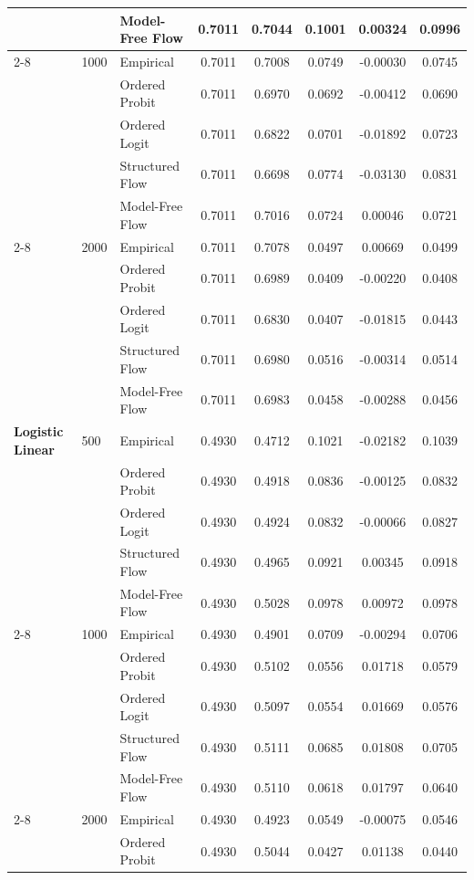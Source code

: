 \begin{table}[p]
\begin{tabular}{lllccccc}
 &  & Model-Free Flow & 0.7011 & 0.7044 & 0.1001 & 0.00324 & 0.0996 \\
\cline{2-8}
 & 1000 & Empirical & 0.7011 & 0.7008 & 0.0749 & -0.00030 & 0.0745 \\
 &  & Ordered Probit & 0.7011 & 0.6970 & 0.0692 & -0.00412 & 0.0690 \\
 &  & Ordered Logit & 0.7011 & 0.6822 & 0.0701 & -0.01892 & 0.0723 \\
 &  & Structured Flow & 0.7011 & 0.6698 & 0.0774 & -0.03130 & 0.0831 \\
 &  & Model-Free Flow & 0.7011 & 0.7016 & 0.0724 & 0.00046 & 0.0721 \\
\cline{2-8}
 & 2000 & Empirical & 0.7011 & 0.7078 & 0.0497 & 0.00669 & 0.0499 \\
 &  & Ordered Probit & 0.7011 & 0.6989 & 0.0409 & -0.00220 & 0.0408 \\
 &  & Ordered Logit & 0.7011 & 0.6830 & 0.0407 & -0.01815 & 0.0443 \\
 &  & Structured Flow & 0.7011 & 0.6980 & 0.0516 & -0.00314 & 0.0514 \\
 &  & Model-Free Flow & 0.7011 & 0.6983 & 0.0458 & -0.00288 & 0.0456 \\
\midrule
\textbf{Logistic Linear} & 500 & Empirical & 0.4930 & 0.4712 & 0.1021 & -0.02182 & 0.1039 \\
 &  & Ordered Probit & 0.4930 & 0.4918 & 0.0836 & -0.00125 & 0.0832 \\
 &  & Ordered Logit & 0.4930 & 0.4924 & 0.0832 & -0.00066 & 0.0827 \\
 &  & Structured Flow & 0.4930 & 0.4965 & 0.0921 & 0.00345 & 0.0918 \\
 &  & Model-Free Flow & 0.4930 & 0.5028 & 0.0978 & 0.00972 & 0.0978 \\
\cline{2-8}
 & 1000 & Empirical & 0.4930 & 0.4901 & 0.0709 & -0.00294 & 0.0706 \\
 &  & Ordered Probit & 0.4930 & 0.5102 & 0.0556 & 0.01718 & 0.0579 \\
 &  & Ordered Logit & 0.4930 & 0.5097 & 0.0554 & 0.01669 & 0.0576 \\
 &  & Structured Flow & 0.4930 & 0.5111 & 0.0685 & 0.01808 & 0.0705 \\
 &  & Model-Free Flow & 0.4930 & 0.5110 & 0.0618 & 0.01797 & 0.0640 \\
\cline{2-8}
 & 2000 & Empirical & 0.4930 & 0.4923 & 0.0549 & -0.00075 & 0.0546 \\
 &  & Ordered Probit & 0.4930 & 0.5044 & 0.0427 & 0.01138 & 0.0440 \\

\end{tabular}
\end{table}
